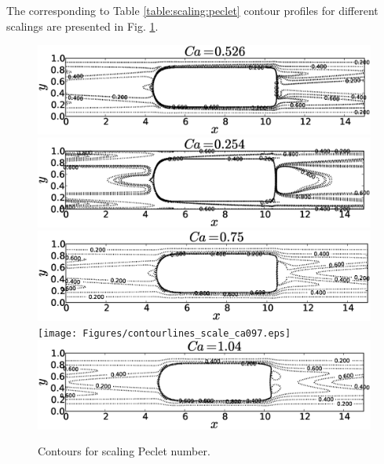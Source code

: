 \documentclass{article}
\begin{document}
The corresponding to Table \ref{table:scaling:peclet} contour profiles for different scalings are
presented in Fig. \ref{fig:contours:scaling:peclet}.
\begin{figure}
\includegraphics[height=0.3\textwidth]{Figures/contourlines_scale_ca026.eps}\\
\includegraphics[height=0.3\textwidth]{Figures/contourlines_scale_ca054.eps}\\
\includegraphics[height=0.3\textwidth]{Figures/contourlines_scale_ca05.eps}\\
\texttt{[image: Figures/contourlines\_scale\_ca097.eps]}\\
\includegraphics[height=0.3\textwidth]{Figures/contourlines_scale_ca14.eps}\\
\caption{Contours for scaling Peclet number.\label{fig:contours:scaling:peclet}}
\end{figure}
\end{document}
